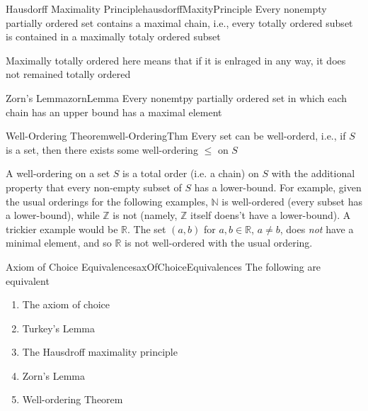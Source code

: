 \documentclass[oneside]{book}
\newcommand{\N}{\mathbb{N}}
\newcommand{\R}{\mathbb{R}}
\newcommand{\Z}{\mathbb{Z}}
\begin{document}
\begin{thm}{Hausdorff Maximality Principle}{hausdorffMaxityPrinciple}
	Every nonempty partially ordered set contains a maximal chain, i.e., every totally ordered subset is contained in
	a maximally totaly ordered subset
\end{thm}

Maximally totally ordered here means that if it is enlraged in any way, it does not remained totally ordered

\begin{thm}{Zorn's Lemma}{zornLemma}
	Every nonemtpy partially ordered set in which each chain has an upper bound has a maximal element
\end{thm}

\begin{thm}{Well-Ordering Theorem}{well-OrderingThm}
	Every set can be well-orderd, i.e., if $S$ is a set, then there exists some well-ordering $\le $ on $S$
\end{thm}

A well-ordering on a set $S$ is a total order (i.e. a chain) on $S$ with the additional property that every non-empty
subset of $S$ has a lower-bound. For example, given the usual orderings for the following examples, $\N$ is well-ordered
(every subset has a lower-bound), while $\Z$ is not (namely, $\Z$ itself doens't have a lower-bound). A trickier example
would be $\R$. The set $(a,b)$ for $a,b \in \R$, $a \ne b$, does \emph{not} have a minimal element, and so $\R$ is not
well-ordered with the usual ordering.

\begin{thm}{Axiom of Choice Equivalences}{axOfChoiceEquivalences}
	The following are equivalent
	\begin{enumerate}
		\item The axiom of choice
		\item Turkey's Lemma
		\item The Hausdroff maximality principle
		\item Zorn's Lemma
		\item Well-ordering Theorem
	\end{enumerate}
\end{thm}
\end{document}
